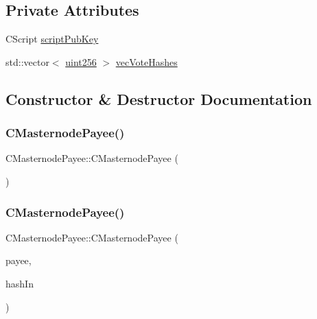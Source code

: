 \subsection*{Private Attributes}
\begin{DoxyCompactItemize}
\item 
C\+Script \mbox{\hyperlink{class_c_masternode_payee_ab7f8d7f7108b556c92edd00ddd190e63}{script\+Pub\+Key}}
\item 
std\+::vector$<$ \mbox{\hyperlink{classuint256}{uint256}} $>$ \mbox{\hyperlink{class_c_masternode_payee_a1c2d5658d7f9d0e80421d674a89427fc}{vec\+Vote\+Hashes}}
\end{DoxyCompactItemize}


\subsection{Constructor \& Destructor Documentation}
\mbox{\label{class_c_masternode_payee_ad2280163b5e84e48061851c42e7bc5fa}} 
\subsubsection{\texorpdfstring{C\+Masternode\+Payee()}{CMasternodePayee()}\hspace{0.1cm}{\footnotesize\ttfamily [1/2]}}
{\footnotesize\ttfamily C\+Masternode\+Payee\+::\+C\+Masternode\+Payee (\begin{DoxyParamCaption}{ }\end{DoxyParamCaption})\hspace{0.3cm}{\ttfamily [inline]}}

\mbox{\label{class_c_masternode_payee_ab55ebed87bf241d648d4ad4f806d8538}} 
\subsubsection{\texorpdfstring{C\+Masternode\+Payee()}{CMasternodePayee()}\hspace{0.1cm}{\footnotesize\ttfamily [2/2]}}
{\footnotesize\ttfamily C\+Masternode\+Payee\+::\+C\+Masternode\+Payee (\begin{DoxyParamCaption}\item[{C\+Script}]{payee,  }\item[{\mbox{\hyperlink{classuint256}{uint256}}}]{hash\+In }\end{DoxyParamCaption})\hspace{0.3cm}{\ttfamily [inline]}}



